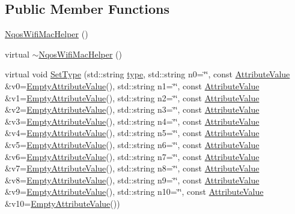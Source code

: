 \subsection*{Public Member Functions}
\begin{DoxyCompactItemize}
\item 
\hyperlink{classns3_1_1NqosWifiMacHelper_ac53d0b06ffc7394c0a51f0bc601ecbe4}{Nqos\+Wifi\+Mac\+Helper} ()
\item 
virtual \hyperlink{classns3_1_1NqosWifiMacHelper_a2097b15a7ccad6cef72df80aa12b50be}{$\sim$\+Nqos\+Wifi\+Mac\+Helper} ()
\item 
virtual void \hyperlink{classns3_1_1NqosWifiMacHelper_ac1f8d1861ce2aa6f62dfd4fc56f8c76a}{Set\+Type} (std\+::string \hyperlink{visualizer-ideas_8txt_add98db9e15e2a58cf2b57623e7aa893a}{type}, std\+::string n0=\char`\"{}\char`\"{}, const \hyperlink{classns3_1_1AttributeValue}{Attribute\+Value} \&v0=\hyperlink{classns3_1_1EmptyAttributeValue}{Empty\+Attribute\+Value}(), std\+::string n1=\char`\"{}\char`\"{}, const \hyperlink{classns3_1_1AttributeValue}{Attribute\+Value} \&v1=\hyperlink{classns3_1_1EmptyAttributeValue}{Empty\+Attribute\+Value}(), std\+::string n2=\char`\"{}\char`\"{}, const \hyperlink{classns3_1_1AttributeValue}{Attribute\+Value} \&v2=\hyperlink{classns3_1_1EmptyAttributeValue}{Empty\+Attribute\+Value}(), std\+::string n3=\char`\"{}\char`\"{}, const \hyperlink{classns3_1_1AttributeValue}{Attribute\+Value} \&v3=\hyperlink{classns3_1_1EmptyAttributeValue}{Empty\+Attribute\+Value}(), std\+::string n4=\char`\"{}\char`\"{}, const \hyperlink{classns3_1_1AttributeValue}{Attribute\+Value} \&v4=\hyperlink{classns3_1_1EmptyAttributeValue}{Empty\+Attribute\+Value}(), std\+::string n5=\char`\"{}\char`\"{}, const \hyperlink{classns3_1_1AttributeValue}{Attribute\+Value} \&v5=\hyperlink{classns3_1_1EmptyAttributeValue}{Empty\+Attribute\+Value}(), std\+::string n6=\char`\"{}\char`\"{}, const \hyperlink{classns3_1_1AttributeValue}{Attribute\+Value} \&v6=\hyperlink{classns3_1_1EmptyAttributeValue}{Empty\+Attribute\+Value}(), std\+::string n7=\char`\"{}\char`\"{}, const \hyperlink{classns3_1_1AttributeValue}{Attribute\+Value} \&v7=\hyperlink{classns3_1_1EmptyAttributeValue}{Empty\+Attribute\+Value}(), std\+::string n8=\char`\"{}\char`\"{}, const \hyperlink{classns3_1_1AttributeValue}{Attribute\+Value} \&v8=\hyperlink{classns3_1_1EmptyAttributeValue}{Empty\+Attribute\+Value}(), std\+::string n9=\char`\"{}\char`\"{}, const \hyperlink{classns3_1_1AttributeValue}{Attribute\+Value} \&v9=\hyperlink{classns3_1_1EmptyAttributeValue}{Empty\+Attribute\+Value}(), std\+::string n10=\char`\"{}\char`\"{}, const \hyperlink{classns3_1_1AttributeValue}{Attribute\+Value} \&v10=\hyperlink{classns3_1_1EmptyAttributeValue}{Empty\+Attribute\+Value}())
\end{DoxyCompactItemize}
